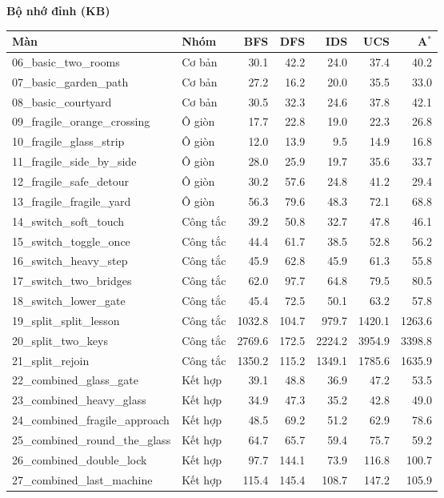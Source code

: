 \vspace{1.1em}

{\textbf{Bộ nhớ đỉnh (KB)}}\\[0.4em]
\begin{tabular}{llrrrrr}
\hline
Màn & Nhóm & BFS & DFS & IDS & UCS & A$^*$ \\
\hline
06\_basic\_two\_rooms & Cơ bản & 30.1 & 42.2 & 24.0 & 37.4 & 40.2 \\
07\_basic\_garden\_path & Cơ bản & 27.2 & 16.2 & 20.0 & 35.5 & 33.0 \\
08\_basic\_courtyard & Cơ bản & 30.5 & 32.3 & 24.6 & 37.8 & 42.1 \\
09\_fragile\_orange\_crossing & Ô giòn & 17.7 & 22.8 & 19.0 & 22.3 & 26.8 \\
10\_fragile\_glass\_strip & Ô giòn & 12.0 & 13.9 & 9.5 & 14.9 & 16.8 \\
11\_fragile\_side\_by\_side & Ô giòn & 28.0 & 25.9 & 19.7 & 35.6 & 33.7 \\
12\_fragile\_safe\_detour & Ô giòn & 30.2 & 57.6 & 24.8 & 41.2 & 29.4 \\
13\_fragile\_fragile\_yard & Ô giòn & 56.3 & 79.6 & 48.3 & 72.1 & 68.8 \\
14\_switch\_soft\_touch & Công tắc & 39.2 & 50.8 & 32.7 & 47.8 & 46.1 \\
15\_switch\_toggle\_once & Công tắc & 44.4 & 61.7 & 38.5 & 52.8 & 56.2 \\
16\_switch\_heavy\_step & Công tắc & 45.9 & 62.8 & 45.9 & 61.3 & 55.8 \\
17\_switch\_two\_bridges & Công tắc & 62.0 & 97.7 & 64.8 & 79.5 & 80.5 \\
18\_switch\_lower\_gate & Công tắc & 45.4 & 72.5 & 50.1 & 63.2 & 57.8 \\
19\_split\_split\_lesson & Công tắc & 1032.8 & 104.7 & 979.7 & 1420.1 & 1263.6 \\
20\_split\_two\_keys & Công tắc & 2769.6 & 172.5 & 2224.2 & 3954.9 & 3398.8 \\
21\_split\_rejoin & Công tắc & 1350.2 & 115.2 & 1349.1 & 1785.6 & 1635.9 \\
22\_combined\_glass\_gate & Kết hợp & 39.1 & 48.8 & 36.9 & 47.2 & 53.5 \\
23\_combined\_heavy\_glass & Kết hợp & 34.9 & 47.3 & 35.2 & 42.8 & 49.0 \\
24\_combined\_fragile\_approach & Kết hợp & 48.5 & 69.2 & 51.2 & 62.9 & 78.6 \\
25\_combined\_round\_the\_glass & Kết hợp & 64.7 & 65.7 & 59.4 & 75.7 & 59.2 \\
26\_combined\_double\_lock & Kết hợp & 97.7 & 144.1 & 73.9 & 116.8 & 100.7 \\
27\_combined\_last\_machine & Kết hợp & 115.4 & 145.4 & 108.7 & 147.2 & 105.9 \\
\hline
\end{tabular}

